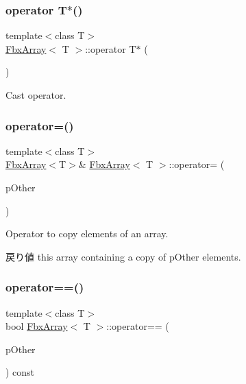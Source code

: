 \subsubsection{\texorpdfstring{operator T$\ast$()}{operator T*()}}
{\footnotesize\ttfamily template$<$class T$>$ \\
\hyperlink{class_fbx_array}{Fbx\+Array}$<$ T $>$\+::operator T$\ast$ (\begin{DoxyParamCaption}{ }\end{DoxyParamCaption})}



Cast operator. 

\mbox{\label{class_fbx_array_a44222dea1bbe2627872dce87b633dcb5}} 
\subsubsection{\texorpdfstring{operator=()}{operator=()}}
{\footnotesize\ttfamily template$<$class T$>$ \\
\hyperlink{class_fbx_array}{Fbx\+Array}$<$T$>$\& \hyperlink{class_fbx_array}{Fbx\+Array}$<$ T $>$\+::operator= (\begin{DoxyParamCaption}\item[{const \hyperlink{class_fbx_array}{Fbx\+Array}$<$ T $>$ \&}]{p\+Other }\end{DoxyParamCaption})}

Operator to copy elements of an array. \begin{DoxyReturn}{戻り値}
this array containing a copy of p\+Other elements. 
\end{DoxyReturn}
\mbox{\label{class_fbx_array_ad0e83571bb944be38ce3bba7079be185}} 
\subsubsection{\texorpdfstring{operator==()}{operator==()}}
{\footnotesize\ttfamily template$<$class T$>$ \\
bool \hyperlink{class_fbx_array}{Fbx\+Array}$<$ T $>$\+::operator== (\begin{DoxyParamCaption}\item[{const \hyperlink{class_fbx_array}{Fbx\+Array}$<$ T $>$ \&}]{p\+Other }\end{DoxyParamCaption}) const}

